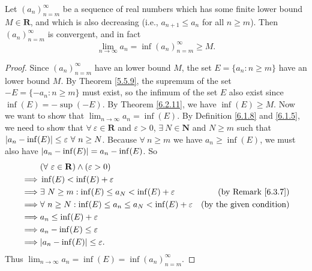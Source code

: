 \begin{additional corollary}\label{ac 6.3.1}
Let \((a_n)_{n = m}^\infty\) be a sequence of real numbers which has some finite lower bound \(M \in \mathbf{R}\), and which is also decreasing (i.e., \(a_{n + 1} \leq a_n\) for all \(n \geq m\)).
Then \((a_n)_{n = m}^\infty\) is convergent, and in fact
\[
    \lim_{n \to \infty} a_n = \inf(a_n)_{n = m}^\infty \geq M.
\]
\end{additional corollary}

\begin{proof}
    Since \((a_n)_{n = m}^\infty\) have an lower bound \(M\), the set \(E = \{a_n : n \geq m\}\) have an lower bound \(M\).
    By Theorem \ref{5.5.9}, the supremum of the set \(-E = \{-a_n : n \geq m\}\) must exist, so the infimum of the set \(E\) also exist since \(\inf(E) = -\sup(-E)\).
    By Theorem \ref{6.2.11}, we have \(\inf(E) \geq M\).
    Now we want to show that \(\lim_{n \to \infty} a_n = \inf(E)\).
    By Definition \ref{6.1.8} and \ref{6.1.5}, we need to show that \(\forall\ \varepsilon \in \mathbf{R}\) and \(\varepsilon > 0\), \(\exists\ N \in \mathbf{N}\) and \(N \geq m\) such that \(\abs*{a_n - \inf(E)} \leq \varepsilon \ \forall\ n \geq N\).
    Because \(\forall\ n \geq m\) we have \(a_n \geq \inf(E)\), we must also have \(\abs*{a_n - \inf(E)} = a_n - \inf(E)\).
    So
    \begin{align*}
                 & (\forall\ \varepsilon \in \mathbf{R}) \land (\varepsilon > 0)                                           \\
        \implies & \inf(E) < \inf(E) + \varepsilon                                                                         \\
        \implies & \exists\ N \geq m : \inf(E) \leq a_N < \inf(E) + \varepsilon          & \text{(by Remark \ref{6.3.7})}  \\
        \implies & \forall\ n \geq N : \inf(E) \leq a_n \leq a_N < \inf(E) + \varepsilon & \text{(by the given condition)} \\
        \implies & a_n \leq \inf(E) + \varepsilon                                                                          \\
        \implies & a_n - \inf(E) \leq \varepsilon                                                                          \\
        \implies & \abs*{a_n - \inf(E)} \leq \varepsilon.
    \end{align*}
    Thus \(\lim_{n \to \infty} a_n = \inf(E) = \inf(a_n)_{n = m}^\infty\).
\end{proof}

